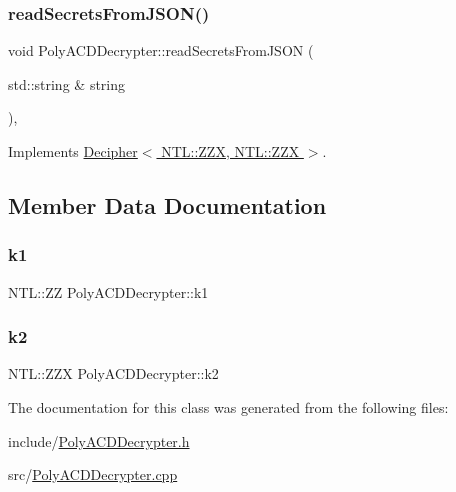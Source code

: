 \subsubsection{\texorpdfstring{read\+Secrets\+From\+J\+S\+O\+N()}{readSecretsFromJSON()}}
{\footnotesize\ttfamily void Poly\+A\+C\+D\+Decrypter\+::read\+Secrets\+From\+J\+S\+ON (\begin{DoxyParamCaption}\item[{std\+::string \&}]{string }\end{DoxyParamCaption})\hspace{0.3cm}{\ttfamily [override]}, {\ttfamily [virtual]}}



Implements \hyperlink{classDecipher_a39aea002012130201e12a8fa7d84dda5}{Decipher$<$ N\+T\+L\+::\+Z\+Z\+X, N\+T\+L\+::\+Z\+Z\+X $>$}.



\subsection{Member Data Documentation}
\mbox{\label{classPolyACDDecrypter_a86ca294cafa0cd5fa070d43127bd8c01}} 
\subsubsection{\texorpdfstring{k1}{k1}}
{\footnotesize\ttfamily N\+T\+L\+::\+ZZ Poly\+A\+C\+D\+Decrypter\+::k1\hspace{0.3cm}{\ttfamily [private]}}

\mbox{\label{classPolyACDDecrypter_a3b0967ca5e6df810ef952521eadefa44}} 
\subsubsection{\texorpdfstring{k2}{k2}}
{\footnotesize\ttfamily N\+T\+L\+::\+Z\+ZX Poly\+A\+C\+D\+Decrypter\+::k2\hspace{0.3cm}{\ttfamily [private]}}



The documentation for this class was generated from the following files\+:\begin{DoxyCompactItemize}
\item 
include/\hyperlink{PolyACDDecrypter_8h}{Poly\+A\+C\+D\+Decrypter.\+h}\item 
src/\hyperlink{PolyACDDecrypter_8cpp}{Poly\+A\+C\+D\+Decrypter.\+cpp}\end{DoxyCompactItemize}
